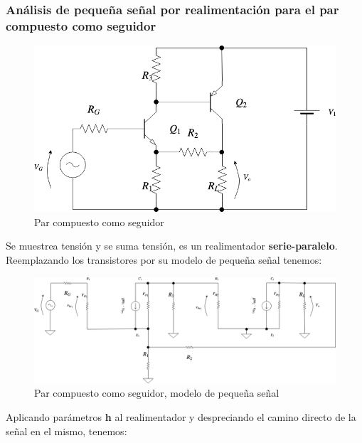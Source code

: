 \subsubsection{Análisis de pequeña señal por realimentación para el par compuesto como seguidor}


\begin{figure}[H] %
\begin{center}
\includegraphics[width=0.9 \textwidth, angle=0]{./img/sziklai/sziklai1.png}
\caption{\label{fig:fig_sziklai_cir_1}\footnotesize{Par compuesto como seguidor}}
\end{center}
\end{figure}

Se muestrea tensión y se suma tensión, es un realimentador \textbf{serie-paralelo}. Reemplazando los transistores por su modelo de pequeña señal tenemos:

\vfill

\clearpage


\begin{figure}[H] %
\begin{center}
\includegraphics[width=0.9 \textwidth, angle=0]{./img/sziklai/sziklai2.png}
\caption{\label{fig:fig_sziklai_cir_2}\footnotesize{Par compuesto como seguidor, modelo de pequeña señal}}
\end{center}
\end{figure}


Aplicando parámetros \textbf{h} al realimentador y despreciando el camino directo de la señal en el mismo, tenemos:


